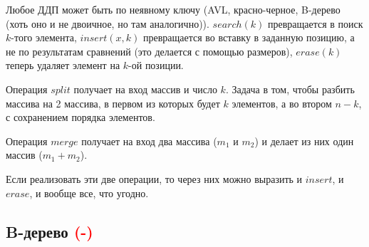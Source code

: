 \begin{note}
    Любое ДДП может быть по неявному ключу (AVL, красно-черное, B-дерево (хоть оно и не двоичное, но там аналогично)). $search(k)$ превращается в поиск $k$-того элемента, $insert(x, k)$ превращается во вставку в заданную позицию, а не по результатам сравнений (это делается с помощью размеров), $erase(k)$ теперь удаляет элемент на $k$-ой позиции.
\end{note}

\begin{definition}
    Операция $split$ получает на вход массив и число $k$. Задача в том, чтобы разбить массива на 2 массива, в первом из которых будет $k$ элементов, а во втором $n-k$, с сохранением порядка элементов.
\end{definition}

\begin{definition}
    Операция $merge$ получает на вход два массива ($m_1$ и $m_2$) и делает из них один массив ($m_1 + m_2$).
\end{definition}

\begin{note}
    Если реализовать эти две операции, то через них можно выразить и $insert$, и $erase$, и вообще все, что угодно.
\end{note}


\subsection{B-дерево \textcolor{red}{(-)}}


